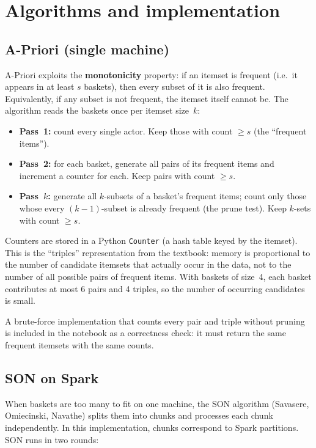 \documentclass[11pt,a4paper]{article}
\begin{document}
\section{Algorithms and implementation}

\subsection{A-Priori (single machine)}

A-Priori exploits the \textbf{monotonicity} property: if an itemset is frequent (i.e.\ it appears in at
least $s$ baskets), then every subset of it is also frequent. Equivalently, if any subset is not frequent,
the itemset itself cannot be. The algorithm reads the baskets once per itemset size~$k$:

\begin{itemize}
  \item \textbf{Pass~1:} count every single actor. Keep those with count $\geq s$ (the ``frequent items'').
  \item \textbf{Pass~2:} for each basket, generate all pairs of its frequent items and increment a counter
        for each. Keep pairs with count $\geq s$.
  \item \textbf{Pass~$k$:} generate all $k$-subsets of a basket's frequent items; count only those whose
        every $(k{-}1)$-subset is already frequent (the prune test). Keep $k$-sets with count $\geq s$.
\end{itemize}

Counters are stored in a Python \texttt{Counter} (a hash table keyed by the itemset). This is the
``triples'' representation from the textbook: memory is proportional to the number of candidate itemsets
that actually occur in the data, not to the number of all possible pairs of frequent items. With baskets
of size~4, each basket contributes at most 6 pairs and 4 triples, so the number of occurring candidates
is small.

A brute-force implementation that counts every pair and triple without pruning is included in the notebook
as a correctness check: it must return the same frequent itemsets with the same counts.

\subsection{SON on Spark}

When baskets are too many to fit on one machine, the SON algorithm (Savasere, Omiecinski, Navathe)
splits them into chunks and processes each chunk independently. In this implementation, chunks correspond
to Spark partitions. SON runs in two rounds:
\end{document}
